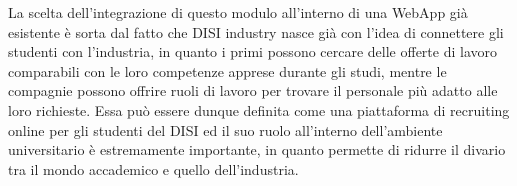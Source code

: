 La scelta dell'integrazione di questo modulo all'interno di una WebApp già esistente è sorta dal fatto che DISI industry nasce già con l'idea di connettere gli studenti con l'industria, in quanto i primi possono cercare delle offerte di lavoro comparabili con le loro competenze apprese durante gli studi, mentre le compagnie possono offrire ruoli di lavoro per trovare il personale più adatto alle loro richieste. Essa può essere dunque definita come una piattaforma di recruiting online per gli studenti del DISI ed il suo ruolo all'interno dell'ambiente universitario è estremamente importante, in quanto permette di ridurre il divario tra il mondo accademico e quello dell'industria. \cite{industry}



